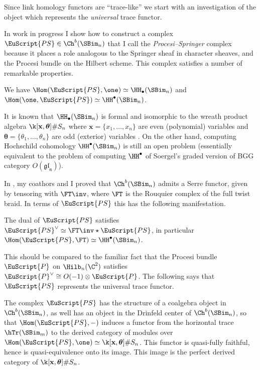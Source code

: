 \documentclass[11pt]{amsart}
\newcommand{\ZU}{\EuScript{PS}}
\newcommand{\PS}{\EuScript{P}}
\newcommand{\xx}{\mathbf{x}}
\newcommand{\ttheta}{\boldsymbol{\theta}}
\newcommand{\gl}{\mathfrak{gl}}
\begin{document}
Since link homology functors are ``trace-like'' we start with an investigation of the object which represents the \emph{universal} trace functor. 

In work in progress I show how to construct a complex $\ZU\in \Ch^b(\SBim_n)$ that I call the \emph{Procesi--Springer} complex because it places a role analogous to the Springer sheaf in character sheaves, and the Procesi bundle on the Hilbert scheme.  This complex satisfies a number of remarkable properties.

\begin{theorem}[In preparation]
We have $\Hom(\ZU,\one)\simeq \HH_\bullet(\SBim_n)$ and $\Hom(\one,\ZU)\simeq \HH^\bullet(\SBim_n)$.
\end{theorem}

It is known that $\HH_\bullet(\SBim_n)$ is formal \cite{HoLiformality} and isomorphic to the wreath product algebra $\k[\xx,\ttheta]\#S_n$ where $\xx=\{x_1,\ldots,x_n\}$ are even (polynomial) variables and $\ttheta=\{\theta_1,\ldots,\theta_n\}$ are odd (exterior) variables \cite{HRWtrace}.  On the other hand, computing Hochschild cohomology $\HH^\bullet(\SBim_n)$ is still an open problem (essentially equivalent to the problem of computing $\HH^\bullet$ of Soergel's graded version of BGG category $O(\mathfrak{\gl_n})$).

In \cite{GHMNserre}, my coathors and I proved that $\Ch^b(\SBim_n)$ admits a Serre functor, given by tensoring with $\FT\inv$, where $\FT$ is the Rouquier complex of the full twist braid.  In terms of $\ZU$ this has the following manifestation.


\begin{theorem}[In preparation]
The dual of $\ZU$ satisfies $\ZU^\vee\simeq \FT\inv\star \ZU$, in particular $\Hom(\ZU,\FT)\simeq \HH^\bullet(\SBim_n)$.
\end{theorem}

This should be compared to the familiar fact that the Procesi bundle $\PS$ on $\Hilb_n(\C^2)$ satisfies $\PS^\vee\cong O(-1)\otimes \PS$.  The following says that $\ZU$ represents the universal trace functor.

\begin{theorem}[In preparation]
The complex $\ZU$ has the structure of a coalgebra object in $\Ch^b(\SBim_n)$, as well has an object in the Drinfeld center of $\Ch^b(\SBim_n)$, so that $\Hom(\ZU,-)$ induces a functor from the horizontal trace $\hTr(\SBim_m)$ to the derived category of modules over $\Hom(\ZU,\one)\simeq \k[\xx,\ttheta]\#S_n$.  This functor is quasi-fully faithful, hence is quasi-equivalence onto  its image.  This image is the perfect derived category of $\k[\xx,\ttheta]\#S_n$.
\end{theorem}
\end{document}
